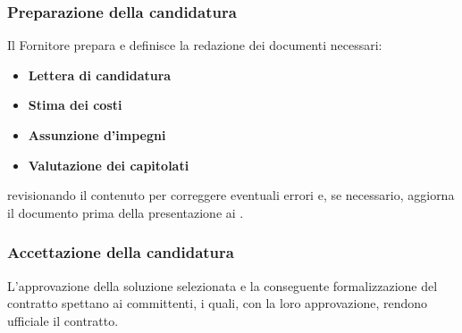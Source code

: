 \subsubsection{Preparazione della candidatura}
Il Fornitore prepara e definisce la redazione dei documenti necessari:
\begin{itemize}
    \item \textbf{Lettera di candidatura}
    \item \textbf{Stima dei costi}
    \item \textbf{Assunzione d’impegni}
    \item \textbf{Valutazione dei capitolati}
\end{itemize}
revisionando il contenuto per correggere eventuali errori e, se necessario, aggiorna il documento prima della presentazione ai .

\subsubsection{Accettazione della candidatura}
L'approvazione della soluzione selezionata e la conseguente formalizzazione del contratto spettano ai committenti, i quali, con la loro approvazione, rendono ufficiale il contratto.